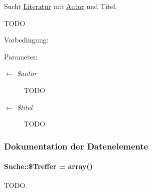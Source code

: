 Sucht \hyperlink{classLiteratur}{Literatur} mit \hyperlink{classAutor}{Autor} und Titel. 

TODO \begin{Desc}
\item[Vorbedingung:]\end{Desc}
\begin{Desc}
\item[Parameter:]
\begin{description}
\item[\mbox{$\leftarrow$} {\em \$autor}]TODO \item[\mbox{$\leftarrow$} {\em \$titel}]TODO \end{description}
\end{Desc}


\subsubsection{Dokumentation der Datenelemente}
\hypertarget{classSuche_0ee0e1ffb3f79392915fd39934d7140d}{
\paragraph[\$Treffer]{\setlength{\rightskip}{0pt plus 5cm}Suche::\$Treffer = array()}\hfill}
\label{classSuche_0ee0e1ffb3f79392915fd39934d7140d}


TODO. 

